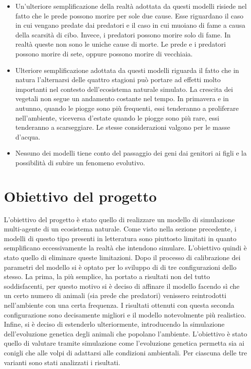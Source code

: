 \documentclass[11pt]{article}
\begin{document}
\begin{itemize}
    \item Un'ulteriore semplificazione della realtà adottata da questi modelli risiede nel fatto che le prede possono morire per sole due cause. Esse riguardano il caso in cui vengano predate dai predatori e il caso in cui muoiano di fame a causa della scarsità di cibo. Invece, i predatori possono morire solo di fame. In realtà queste non sono le uniche cause di morte. Le prede e i predatori possono morire di sete, oppure possono morire di vecchiaia. 
    \item Ulteriore semplificazione adottata da questi modelli riguarda il fatto che in natura l'alternarsi delle quattro stagioni può portare ad effetti molto importanti nel contesto dell'ecosistema naturale simulato. La crescita dei vegetali non segue un andamento costante nel tempo. In primavera e in autunno, quando le piogge sono più frequenti, essi tenderanno a proliferare nell'ambiente, viceversa d'estate quando le piogge sono più rare, essi tenderanno a scarseggiare. Le stesse considerazioni valgono per le masse d'acqua. 
    \item Nessuno dei modelli tiene conto del passaggio dei geni dai genitori ai figli e la possibilità di subire un fenomeno evolutivo. 
\end{itemize}

\section{Obiettivo del progetto}
L'obiettivo del progetto è stato quello di realizzare un modello di simulazione multi-agente di un ecosistema naturale. Come visto nella sezione precedente, i modelli di questo tipo presenti in letteratura sono piuttosto limitati in quanto semplificano eccessivamente la realtà che intendono simulare. L'obiettivo quindi è stato quello di eliminare queste limitazioni. Dopo il processo di calibrazione dei parametri del modello si è optato per lo sviluppo di di tre configurazioni dello stesso. La prima, la più semplice, ha portato a risultati non del tutto soddisfacenti, per questo motivo si è deciso di affinare il modello facendo sì che un certo numero di animali (sia prede che predatori) venissero reintrodotti nell'ambiente con una certa frequenza. I risultati ottenuti con questa seconda configurazione sono decisamente migliori e il modello notevolmente più realistico. Infine, si è deciso di estenderlo ulteriormente, introducendo la simulazione dell'evoluzione genetica degli animali che popolano l'ambiente. L'obiettivo è stato quello di valutare tramite simulazione come l'evoluzione genetica permetta sia ai conigli che alle volpi di adattarsi alle condizioni ambientali. Per ciascuna delle tre varianti sono stati analizzati i risultati. 
\end{document}

